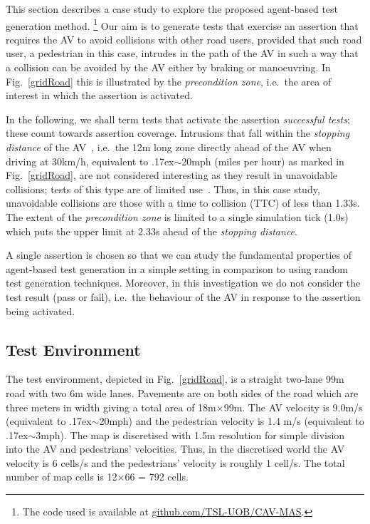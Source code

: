 \documentclass[runningheads,a4paper]{llncs}
\begin{document}
This section describes a case study to explore the proposed agent-based test generation method. \footnote{The code used is available at \url{github.com/TSL-UOB/CAV-MAS}.} Our aim is to generate tests that exercise an assertion that requires the AV to avoid collisions with other road users, provided that such road user, a pedestrian in this case, intrudes in the path of the AV in such a way that a collision can be avoided by the AV either by braking or manoeuvring. In Fig.~\ref{gridRoad} this is illustrated by the \textit{precondition zone}, i.e.\ the area of interest in which the assertion is activated.

In the following, we shall term tests that activate the assertion \textit{successful tests}; these count towards assertion coverage. 
Intrusions that fall within the \textit{stopping distance} of the AV~\cite{codes2015highway}, i.e.\ the 12m long zone directly ahead of the AV when driving at 30km/h, equivalent to {\raise.17ex\hbox{$\scriptstyle\sim$}}20mph (miles per hour) as marked in Fig.~\ref{gridRoad}, are not considered interesting as they result in unavoidable collisions; tests of this type are of limited use~\cite{Tuncali2018}. Thus, in this case study, unavoidable collisions are those with a time to collision (TTC) of less than 1.33s. The extent of the \textit{precondition zone} is limited to a single simulation tick (1.0s) which puts the upper limit at 2.33s ahead of the \textit{stopping distance}.%

A single assertion is chosen so that we can study the fundamental properties of agent-based test generation in a simple setting in comparison to using random test generation techniques. Moreover, in this investigation we do not consider the test result (pass or fail), i.e.\ the behaviour of the AV in response to the assertion being activated. 


\subsection{Test Environment}
The test environment, depicted in Fig.~\ref{gridRoad}, is a straight two-lane 99m road with two 6m wide lanes. Pavements are on both sides of the road which are three meters in width giving a total area of 18m$\times$99m. The AV velocity is 9.0m/s (equivalent to {\raise.17ex\hbox{$\scriptstyle\sim$}}20mph) and the pedestrian velocity is 1.4 m/s (equivalent to {\raise.17ex\hbox{$\scriptstyle\sim$}}3mph). The map is discretised with 1.5m resolution for simple division into the AV and pedestrians' velocities. Thus, in the discretised world the AV velocity is 6 cells/s and the pedestrians' velocity is roughly 1 cell/s. The total number of map cells is 12$\times$66 = 792 cells. 
\end{document}
